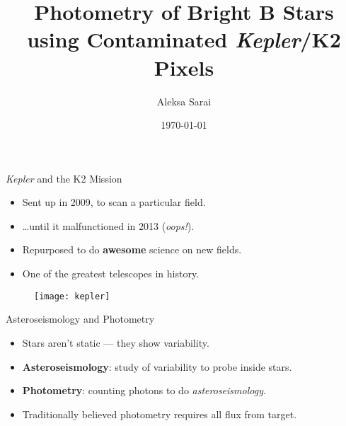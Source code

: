 \documentclass[10pt]{beamer}
\title{Photometry of Bright B Stars using Contaminated \textit{Kepler}/K2 Pixels}
\author{Aleksa Sarai}
\date{\today}
\institute{SIfA --- University of Sydney}
\begin{document}
	\maketitle

	\begin{frame}{\textit{Kepler} and the K2 Mission}
		\begin{overlayarea}{\textwidth}{.3\textheight}
			\begin{itemize}
				\item Sent up in 2009, to scan a particular field.
				\item \dots until it malfunctioned in 2013 (\textit{oops!}).
				\item Repurposed to do \textbf{awesome} science on new fields.
				\item One of the greatest telescopes in history.
			\end{itemize}
		\end{overlayarea}

		\vfill

		\begin{figure}
			\centering
				\texttt{[image: kepler]}
		\end{figure}
	\end{frame}

	\begin{frame}{Asteroseismology and Photometry}
		\begin{overlayarea}{\textwidth}{.5\textheight}
			\begin{figure}
				\centering
			\end{figure}
		\end{overlayarea}

		\vfill

		\begin{itemize}
			\item Stars aren't static --- they show variability.
			\item \textbf{Asteroseismology}: study of variability to probe inside stars.
			\item \textbf{Photometry}: counting photons to do \textit{asteroseismology}.
			\item Traditionally believed photometry requires all flux from target.
		\end{itemize}
	\end{frame}
\end{document}
